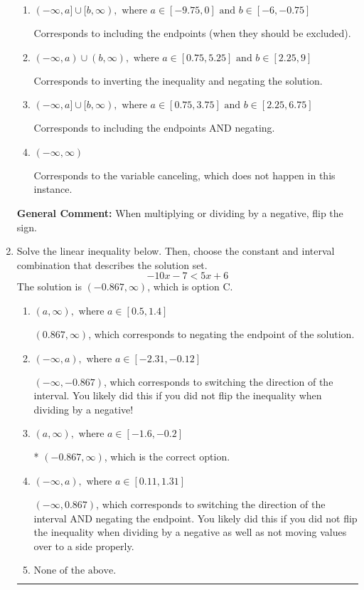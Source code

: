 \documentclass{extbook}[14pt]
\newcommand{\litem}[1]{\item #1

\rule{\textwidth}{0.4pt}}
\begin{document}
\begin{enumerate}
{\begin{enumerate}[label=\Alph*.]
 * Correct option.
\item \( (-\infty, a] \cup [b, \infty), \text{ where } a \in [-9.75, 0] \text{ and } b \in [-6, -0.75] \)

Corresponds to including the endpoints (when they should be excluded).
\item \( (-\infty, a) \cup (b, \infty), \text{ where } a \in [0.75, 5.25] \text{ and } b \in [2.25, 9] \)

Corresponds to inverting the inequality and negating the solution.
\item \( (-\infty, a] \cup [b, \infty), \text{ where } a \in [0.75, 3.75] \text{ and } b \in [2.25, 6.75] \)

Corresponds to including the endpoints AND negating.
\item \( (-\infty, \infty) \)

Corresponds to the variable canceling, which does not happen in this instance.
\end{enumerate}

\textbf{General Comment:} When multiplying or dividing by a negative, flip the sign.
}
\litem{
Solve the linear inequality below. Then, choose the constant and interval combination that describes the solution set.
\[ -10x -7 < 5x + 6 \]The solution is \( (-0.867, \infty) \), which is option C.\begin{enumerate}[label=\Alph*.]
\item \( (a, \infty), \text{ where } a \in [0.5, 1.4] \)

 $(0.867, \infty)$, which corresponds to negating the endpoint of the solution.
\item \( (-\infty, a), \text{ where } a \in [-2.31, -0.12] \)

 $(-\infty, -0.867)$, which corresponds to switching the direction of the interval. You likely did this if you did not flip the inequality when dividing by a negative!
\item \( (a, \infty), \text{ where } a \in [-1.6, -0.2] \)

* $(-0.867, \infty)$, which is the correct option.
\item \( (-\infty, a), \text{ where } a \in [0.11, 1.31] \)

 $(-\infty, 0.867)$, which corresponds to switching the direction of the interval AND negating the endpoint. You likely did this if you did not flip the inequality when dividing by a negative as well as not moving values over to a side properly.
\item \( \text{None of the above}. \)


\end{enumerate}}
\end{enumerate}
\end{document}

